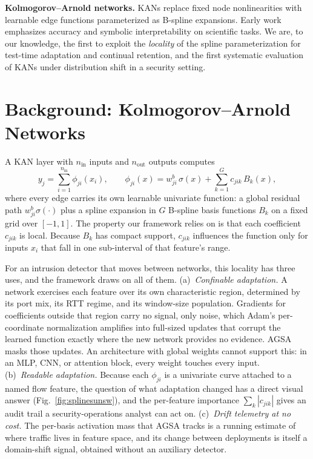 \documentclass[10pt, conference, letterpaper]{IEEEtran}
\begin{document}
\textbf{Kolmogorov--Arnold networks.} KANs \cite{liu2024kan} replace
fixed node nonlinearities with learnable edge functions parameterized as
B-spline expansions. Early work emphasizes accuracy and symbolic
interpretability on scientific tasks. We are, to our knowledge, the
first to exploit the \emph{locality} of the spline parameterization for
test-time adaptation and continual retention, and the first systematic
evaluation of KANs under distribution shift in a security setting.

\section{Background: Kolmogorov--Arnold Networks}
\label{sec:kan}
A KAN layer with $n_{\text{in}}$ inputs and $n_{\text{out}}$ outputs
computes
\begin{equation}
y_j=\sum_{i=1}^{n_{\text{in}}}\phi_{ji}(x_i),\qquad
\phi_{ji}(x)=w^{b}_{ji}\,\sigma(x)+\sum_{k=1}^{G}c_{jik}\,B_k(x),
\label{eq:kan}
\end{equation}
where every edge carries its own learnable univariate function: a
global residual path $w^{b}_{ji}\sigma(\cdot)$ plus a spline expansion
in $G$ B-spline basis functions $B_k$ on a fixed grid over $[-1,1]$.
The property our framework relies on is that each coefficient
$c_{jik}$ is local. Because $B_k$ has compact support, $c_{jik}$
influences the function only for inputs $x_i$ that fall in one
sub-interval of that feature's range.

For an intrusion detector that moves between networks, this locality
has three uses, and the framework draws on all of them.
(a)~\emph{Confinable adaptation.} A network exercises each feature
over its own characteristic region, determined by its port mix, its
RTT regime, and its window-size population. Gradients for coefficients
outside that region carry no signal, only noise, which Adam's
per-coordinate normalization \cite{kingma2015adam} amplifies into
full-sized updates that corrupt the learned function exactly where the
new network provides no evidence. AGSA masks those updates. An
architecture with global weights cannot support this: in an MLP, CNN,
or attention block, every weight touches every input.
(b)~\emph{Readable adaptation.} Because each $\phi_{ji}$ is a
univariate curve attached to a named flow feature, the question of
what adaptation changed has a direct visual answer
(Fig.~\ref{fig:splinesunsw}), and the per-feature importance
$\sum_k|c_{jik}|$ gives an audit trail a security-operations analyst
can act on.
(c)~\emph{Drift telemetry at no cost.} The per-basis activation mass
that AGSA tracks is a running estimate of where traffic lives in
feature space, and its change between deployments is itself a
domain-shift signal, obtained without an auxiliary detector.
\end{document}
